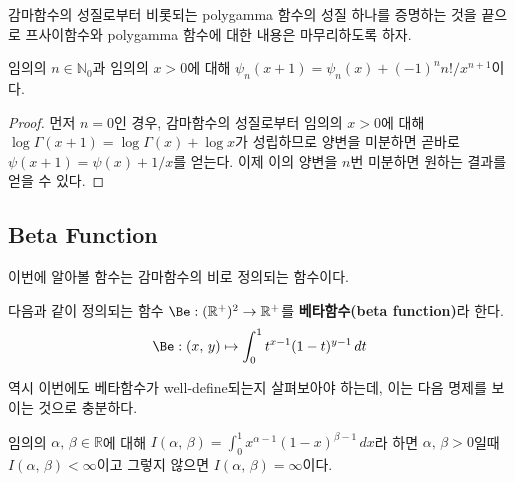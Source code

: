 감마함수의 성질로부터 비롯되는 polygamma 함수의 성질 하나를 증명하는 것을 끝으로 프사이함수와 polygamma 함수에 대한 내용은 마무리하도록 하자.

\begin{theorem}
    임의의 $n\in\mathbb{N}_0$과 임의의 $x>0$에 대해 $\psi_n(x+1)=\psi_n(x)+(-1)^nn!/x^{n+1}$이다.
\end{theorem}

\begin{proof}
    먼저 $n=0$인 경우, 감마함수의 성질로부터 임의의 $x>0$에 대해 $\log\Gamma(x+1)=\log\Gamma(x)+\log x$가 성립하므로 양변을 미분하면 곧바로 $\psi(x+1)=\psi(x)+1/x$를 얻는다. 이제 이의 양변을 $n$번 미분하면 원하는 결과를 얻을 수 있다.
\end{proof}

\subsection{Beta Function}

이번에 알아볼 함수는 감마함수의 비로 정의되는 함수이다.

\begin{definition}
    다음과 같이 정의되는 함수 $\Be:(\mathbb{R}^+)^2\to\mathbb{R}^+$를 \textbf{베타함수(beta function)}라 한다.
    \begin{equation*}
        \Be:(x,\,y)\mapsto\int_0^1t^{x-1}(1-t)^{y-1}\,dt
    \end{equation*}
\end{definition}

역시 이번에도 베타함수가 well-define되는지 살펴보아야 하는데, 이는 다음 명제를 보이는 것으로 충분하다.

\begin{proposition}\label{prop:betaWellDefine}
    임의의 $\alpha,\,\beta\in\mathbb{R}$에 대해 $I(\alpha,\,\beta)=\int_0^1x^{\alpha-1}(1-x)^{\beta-1}\,dx$라 하면 $\alpha,\,\beta>0$일때 $I(\alpha,\,\beta)<\infty$이고 그렇지 않으면 $I(\alpha,\,\beta)=\infty$이다.
\end{proposition}

